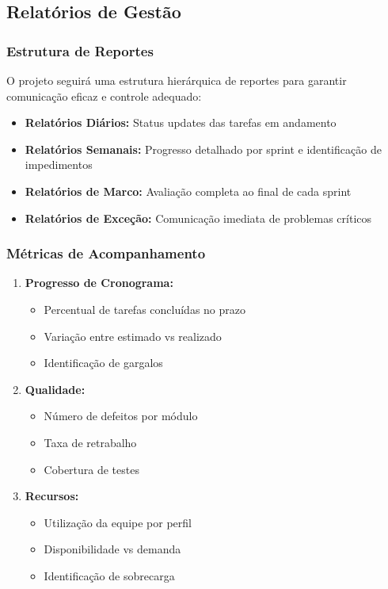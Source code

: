 \subsection{Relatórios de Gestão}

\subsubsection{Estrutura de Reportes}

O projeto seguirá uma estrutura hierárquica de reportes para garantir comunicação eficaz e controle adequado:

\begin{itemize}
    \item \textbf{Relatórios Diários:} Status updates das tarefas em andamento
    \item \textbf{Relatórios Semanais:} Progresso detalhado por sprint e identificação de impedimentos
    \item \textbf{Relatórios de Marco:} Avaliação completa ao final de cada sprint
    \item \textbf{Relatórios de Exceção:} Comunicação imediata de problemas críticos
\end{itemize}

\subsubsection{Métricas de Acompanhamento}

\begin{enumerate}
    \item \textbf{Progresso de Cronograma:}
    \begin{itemize}
        \item Percentual de tarefas concluídas no prazo
        \item Variação entre estimado vs realizado
        \item Identificação de gargalos
    \end{itemize}
    
    \item \textbf{Qualidade:}
    \begin{itemize}
        \item Número de defeitos por módulo
        \item Taxa de retrabalho
        \item Cobertura de testes
    \end{itemize}
    
    \item \textbf{Recursos:}
    \begin{itemize}
        \item Utilização da equipe por perfil
        \item Disponibilidade vs demanda
        \item Identificação de sobrecarga
    \end{itemize}
\end{enumerate}

